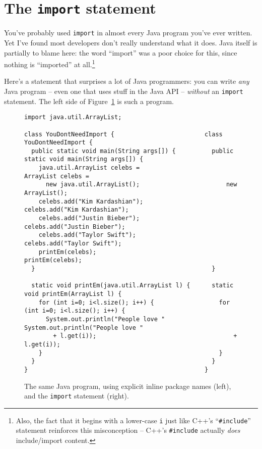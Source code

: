 \section{The \texttt{import} statement}
\label{sec:import}

You've probably used \texttt{import} in almost every Java program you've ever
written. Yet I've found most developers don't really understand what it does.
Java itself is partially to blame here: the word ``import'' was a poor choice
for this, since nothing is ``imported'' at all.\footnote{Also, the fact that
it begins with a lower-case \texttt{i} just like C++'s ``\texttt{\#include}''
statement reinforces this misconception -- C++'s \texttt{\#include} actually
\textit{does} include/import content.}

Here's a statement that surprises a lot of Java programmers: you can write
\textit{any} Java program -- even one that uses stuff in the Java API --
\textit{without} an \texttt{import} statement. The left side of
Figure~\ref{fig:dontNeedImport} is such a program.

\begin{figure}[ht]
\begin{Verbatim}[fontsize=\scriptsize,samepage=true,frame=single]
                                                  import java.util.ArrayList;

class YouDontNeedImport {                         class YouDontNeedImport {                                                 
  public static void main(String args[]) {          public static void main(String args[]) {
    java.util.ArrayList celebs =                      ArrayList celebs =
      new java.util.ArrayList();                        new ArrayList();
    celebs.add("Kim Kardashian");                     celebs.add("Kim Kardashian");
    celebs.add("Justin Bieber");                      celebs.add("Justin Bieber");
    celebs.add("Taylor Swift");                       celebs.add("Taylor Swift");
    printEm(celebs);                                  printEm(celebs);
  }                                                 }
                                                
  static void printEm(java.util.ArrayList l) {      static void printEm(ArrayList l) {
    for (int i=0; i<l.size(); i++) {                  for (int i=0; i<l.size(); i++) {
      System.out.println("People love "                 System.out.println("People love "
        + l.get(i));                                      + l.get(i));
    }                                                 }
  }                                                 }
}                                                 }
\end{Verbatim}
\caption{The same Java program, using explicit inline package names (left),
and the \texttt{import} statement (right).}
\label{fig:dontNeedImport}
\end{figure}

